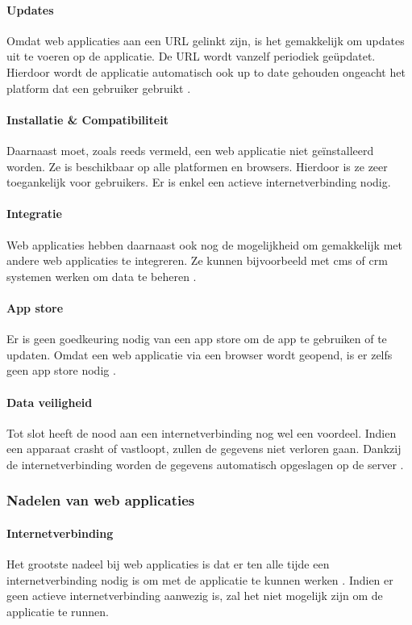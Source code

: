 \paragraph{Updates}
Omdat web applicaties aan een URL gelinkt zijn, is het gemakkelijk om updates uit te voeren op de applicatie. 
De URL wordt vanzelf periodiek geüpdatet. Hierdoor wordt de applicatie automatisch ook up to date gehouden 
ongeacht het platform dat een gebruiker gebruikt \autocite{Varsha2023}.

\paragraph{Installatie \& Compatibiliteit}
Daarnaast moet, zoals reeds vermeld, een web applicatie niet geïnstalleerd worden. Ze is beschikbaar op alle 
platformen en browsers. Hierdoor is ze zeer toegankelijk voor gebruikers. Er is enkel een actieve 
internetverbinding nodig.

\paragraph{Integratie}
Web applicaties hebben daarnaast ook nog de mogelijkheid om gemakkelijk met andere web applicaties te integreren. 
Ze kunnen bijvoorbeeld met \acrshort{cms} of \acrshort{crm} systemen werken om data te beheren \autocite{Nehra2023}.

\paragraph{App store}
Er is geen goedkeuring nodig van een app store om de app te gebruiken of te updaten. Omdat een web applicatie 
via een browser wordt geopend, is er zelfs geen app store nodig \autocite{Varsha2023}.

\paragraph{Data veiligheid}
Tot slot heeft de nood aan een internetverbinding nog wel een voordeel. Indien een apparaat
crasht of vastloopt, zullen de gegevens niet verloren gaan. Dankzij de internetverbinding worden de
gegevens automatisch opgeslagen op de server \autocite{Nehra2023}.

\subsubsection{Nadelen van web applicaties}
\paragraph{Internetverbinding}
Het grootste nadeel bij web applicaties is dat er ten alle tijde een internetverbinding nodig is om met 
de applicatie te kunnen werken \autocite{Varsha2023}. Indien er geen actieve internetverbinding aanwezig is, 
zal het niet mogelijk zijn om de applicatie te runnen.

